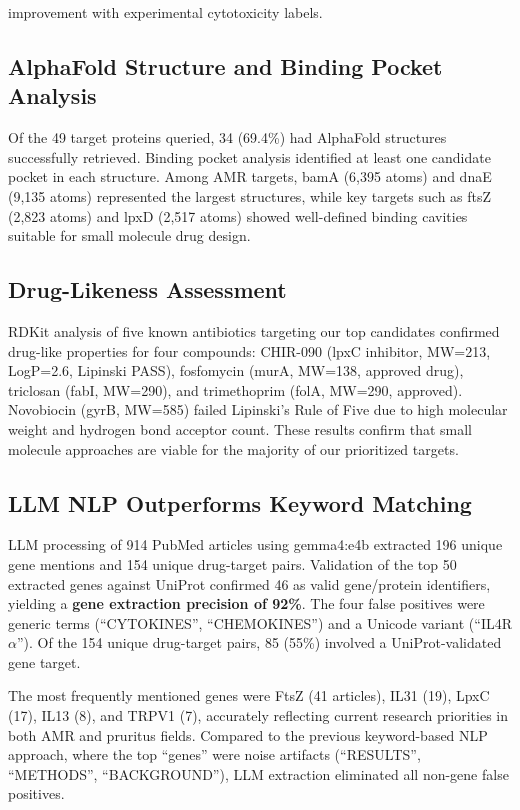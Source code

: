 \documentclass[12pt,a4paper]{article}
\begin{document}
improvement with experimental cytotoxicity labels.

\subsection{AlphaFold Structure and Binding Pocket Analysis}
Of the 49 target proteins queried, 34 (69.4\%) had AlphaFold structures successfully retrieved. Binding pocket analysis identified at least one candidate pocket in each structure. Among AMR targets, bamA (6,395 atoms) and dnaE (9,135 atoms) represented the largest structures, while key targets such as ftsZ (2,823 atoms) and lpxD (2,517 atoms) showed well-defined binding cavities suitable for small molecule drug design.

\subsection{Drug-Likeness Assessment}
RDKit analysis of five known antibiotics targeting our top candidates confirmed drug-like properties for four compounds: CHIR-090 (lpxC inhibitor, MW=213, LogP=2.6, Lipinski PASS), fosfomycin (murA, MW=138, approved drug), triclosan (fabI, MW=290), and trimethoprim (folA, MW=290, approved). Novobiocin (gyrB, MW=585) failed Lipinski's Rule of Five due to high molecular weight and hydrogen bond acceptor count. These results confirm that small molecule approaches are viable for the majority of our prioritized targets.

\subsection{LLM NLP Outperforms Keyword Matching}
LLM processing of 914 PubMed articles using gemma4:e4b extracted 196 unique gene mentions and 154 unique drug-target pairs. Validation of the top 50 extracted genes against UniProt confirmed 46 as valid gene/protein identifiers, yielding a \textbf{gene extraction precision of 92\%}. The four false positives were generic terms (``CYTOKINES'', ``CHEMOKINES'') and a Unicode variant (``IL4R$\alpha$''). Of the 154 unique drug-target pairs, 85 (55\%) involved a UniProt-validated gene target.

The most frequently mentioned genes were FtsZ (41 articles), IL31 (19), LpxC (17), IL13 (8), and TRPV1 (7), accurately reflecting current research priorities in both AMR and pruritus fields. Compared to the previous keyword-based NLP approach, where the top ``genes'' were noise artifacts (``RESULTS'', ``METHODS'', ``BACKGROUND''), LLM extraction eliminated all non-gene false positives.
\end{document}
